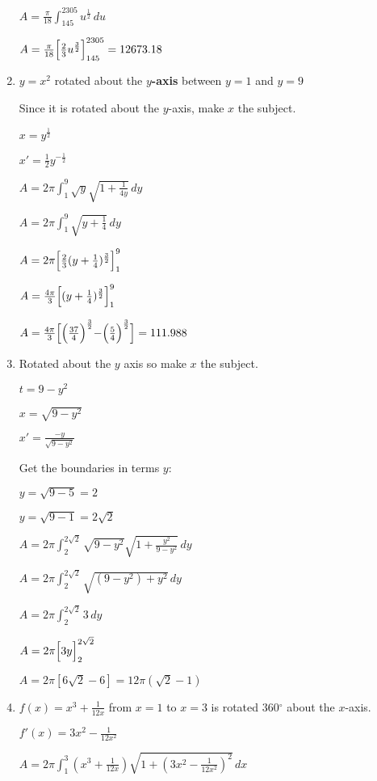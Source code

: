 \documentclass[../main.tex]{subfiles}
\begin{document}
\begin{enumerate}[itemsep=0.7cm]
    $A=\frac{\pi}{18} \int_{145}^{2305} u^{\frac{1}{2}}\,du$
    
    $A=\frac{\pi}{18}\Bigl[\frac{2}{3}u^{\frac{3}{2}}\Bigr]_{145}^{2305}=12673.18$

    \item 
    $y=x^2$ rotated about the \textbf{$y$-axis} between $y=1$ and $y=9$

    Since it is rotated about the $y$-axis, make $x$ the subject.

    $x=y^{\frac{1}{2}}$

    $x'=\frac{1}{2}y^{-\frac{1}{2}}$

    $A=2\pi \int_1^9 \sqrt{y}\sqrt{1+\frac{1}{4y}}\,dy$

    $A=2\pi \int_1^9 \sqrt{y+\frac{1}{4}}\,dy$

    $A=2\pi \Bigl[\frac{2}{3}(y+\frac{1}{4})^{\frac{3}{2}}\Bigr]_1^9$

    $A=\frac{4\pi}{3} \Bigl[(y+\frac{1}{4})^{\frac{3}{2}}\Bigr]_1^9$

    $A=\frac{4\pi}{3}\Bigl[\Bigl(\frac{37}{4}\Bigr)^{\frac{3}{2}}-\Bigr(\frac{5}{4}\Bigl)^{\frac{3}{2}}\Bigr]=111.988$

    \item 
    Rotated about the $y$ axis so make $x$ the subject.

    $t=9-y^2$

    $x=\sqrt{9-y^2}$

    $x'=\frac{-y}{\sqrt{9-y^2}}$

    Get the boundaries in terms $y$:

    $y=\sqrt{9-5}=2$

    $y=\sqrt{9-1}=2\sqrt{2}$

    $A=2\pi \int_2^{2\sqrt{2}} \sqrt{9-y^2}\sqrt{1+\frac{y^2}{9-y^2}}\,dy$

    $A=2\pi \int_2^{2\sqrt{2}} \sqrt{(9-y^2)+y^2}\,dy$

    $A=2\pi \int_2^{2\sqrt{2}} 3\,dy$

    $A=2\pi \Bigl[3y\Bigr]_2^{2\sqrt{2}}$
    
    $A=2\pi [6\sqrt{2}-6]=12\pi(\sqrt{2}-1)$


    \item 
    $f(x)=x^3+\frac{1}{12x}$ from $x=1$ to $x=3$ is rotated 360$^\circ$ about the $x$-axis.

    $f'(x)=3x^2-\frac{1}{12x^2}$

    $A=2\pi \int_1^3 (x^3+\frac{1}{12x})\sqrt{1+(3x^2-\frac{1}{12x^2})^2}\,dx$


\end{enumerate}
\end{document}
